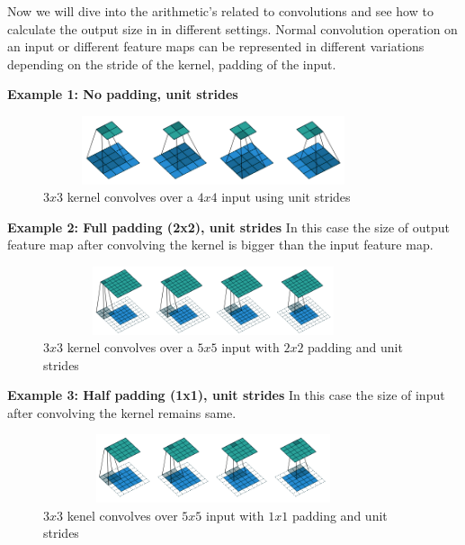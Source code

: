     Now we will dive into the arithmetic's related to convolutions and see how to calculate the output size in
    in different settings. Normal convolution operation on an input or different feature maps can be represented in different variations depending on the stride of the kernel, padding of the input. 
    
    \textbf{Example 1: No padding, unit strides}   
    
      \begin{figure}[h]
    \centering
    \includegraphics[width=10cm, height =2cm]{images/cnn_case1.png}
    \caption{$3x3$ kernel convolves over a $4x4$ input using unit strides \cite{https://doi.org/10.48550/arxiv.1603.07285}}
    \end{figure}
    
    \textbf{Example 2: Full padding (2x2), unit strides} 
    In this case the size of output feature map after convolving the kernel is bigger than the input feature map.
      \begin{figure}[h]
    \centering
    \includegraphics[width=10cm, height =2cm]{images/cnn_case4.png}
    \caption{$3x3$ kernel convolves over a $5x5$ input with $2x2$ padding and unit strides \cite{https://doi.org/10.48550/arxiv.1603.07285}}
    \end{figure}
    
    \textbf{Example 3: Half padding (1x1), unit strides}
    In this case the size of input after convolving the kernel remains same. 
      \begin{figure}[h]
    \centering
    \includegraphics[width=10cm, height =2cm]{images/cnn_case3.png}
    \caption{$3x3$ kenel convolves over $5x5$ input with $1x1$ padding and unit strides \cite{https://doi.org/10.48550/arxiv.1603.07285}}
    \end{figure}
    
